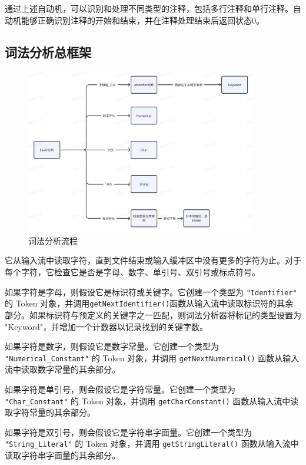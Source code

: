 \documentclass[lang=cn,11pt,a4paper]{elegantpaper}
\begin{document}
通过上述自动机，可以识别和处理不同类型的注释，包括多行注释和单行注释。自动机能够正确识别注释的开始和结束，并在注释处理结束后返回状态0。

\subsection{词法分析总框架}

\begin{figure}[!htb]
    \centering
    \includegraphics[width=0.9\textwidth]{image/Framework.png}
    \caption{词法分析流程}
\end{figure}

它从输入流中读取字符，直到文件结束或输入缓冲区中没有更多的字符为止。对于每个字符，它检查它是否是字母、数字、单引号、双引号或标点符号。

如果字符是字母，则假设它是标识符或关键字。它创建一个类型为 \lstinline{"Identifier"} 的 Token 对象，并调用\lstinline{getNextIdentifier()}函数从输入流中读取标识符的其余部分。如果标识符与预定义的关键字之一匹配，则词法分析器将标记的类型设置为 "Keyword"，并增加一个计数器以记录找到的关键字数。

如果字符是数字，则假设它是数字常量。它创建一个类型为 \lstinline{"Numerical_Constant"} 的 Token 对象，并调用 
\lstinline{getNextNumerical()} 函数从输入流中读取数字常量的其余部分。

如果字符是单引号，则会假设它是字符常量。它创建一个类型为 \lstinline{"Char_Constant"} 的 Token 对象，并调用 \lstinline{getCharConstant()} 函数从输入流中读取字符常量的其余部分。

如果字符是双引号，则会假设它是字符串字面量。它创建一个类型为 \lstinline{"String_Literal"} 的 Token 对象，并调用 \lstinline{getStringLiteral()} 函数从输入流中读取字符串字面量的其余部分。
\end{document}
